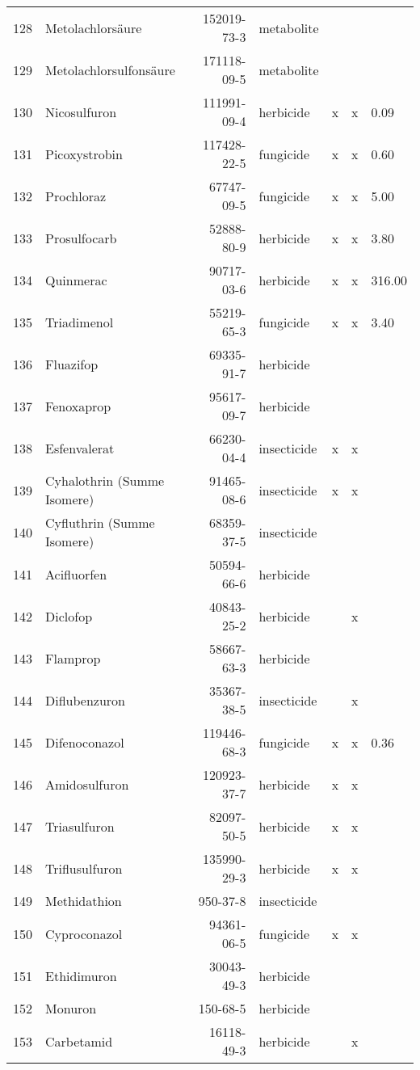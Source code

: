 \begin{longtable}{lp{3cm}rlp{0.5cm}p{0.5cm}p{1cm}}
  128 & Metolachlorsäure & 152019-73-3 & metabolite &  &  &  \\ 
  129 & Metolachlorsulfonsäure & 171118-09-5 & metabolite &  &  &  \\ 
  130 & Nicosulfuron & 111991-09-4 & herbicide & x & x & 0.09 \\ 
  131 & Picoxystrobin & 117428-22-5 & fungicide & x & x & 0.60 \\ 
  132 & Prochloraz & 67747-09-5 & fungicide & x & x & 5.00 \\ 
  133 & Prosulfocarb & 52888-80-9 & herbicide & x & x & 3.80 \\ 
  134 & Quinmerac & 90717-03-6 & herbicide & x & x & 316.00 \\ 
  135 & Triadimenol & 55219-65-3 & fungicide & x & x & 3.40 \\ 
  136 & Fluazifop & 69335-91-7 & herbicide &  &  &  \\ 
  137 & Fenoxaprop & 95617-09-7 & herbicide &  &  &  \\ 
  138 & Esfenvalerat & 66230-04-4 & insecticide & x & x &  \\ 
  139 & Cyhalothrin (Summe Isomere) & 91465-08-6 & insecticide & x & x &  \\ 
  140 & Cyfluthrin (Summe Isomere) & 68359-37-5 & insecticide &  &  &  \\ 
  141 & Acifluorfen & 50594-66-6 & herbicide &  &  &  \\ 
  142 & Diclofop & 40843-25-2 & herbicide &  & x &  \\ 
  143 & Flamprop & 58667-63-3 & herbicide &  &  &  \\ 
  144 & Diflubenzuron & 35367-38-5 & insecticide &  & x &  \\ 
  145 & Difenoconazol & 119446-68-3 & fungicide & x & x & 0.36 \\ 
  146 & Amidosulfuron & 120923-37-7 & herbicide & x & x &  \\ 
  147 & Triasulfuron & 82097-50-5 & herbicide & x & x &  \\ 
  148 & Triflusulfuron & 135990-29-3 & herbicide & x & x &  \\ 
  149 & Methidathion & 950-37-8 & insecticide &  &  &  \\ 
  150 & Cyproconazol & 94361-06-5 & fungicide & x & x &  \\ 
  151 & Ethidimuron & 30043-49-3 & herbicide &  &  &  \\ 
  152 & Monuron & 150-68-5 & herbicide &  &  &  \\ 
  153 & Carbetamid & 16118-49-3 & herbicide &  & x &  \\ 

\end{longtable}
